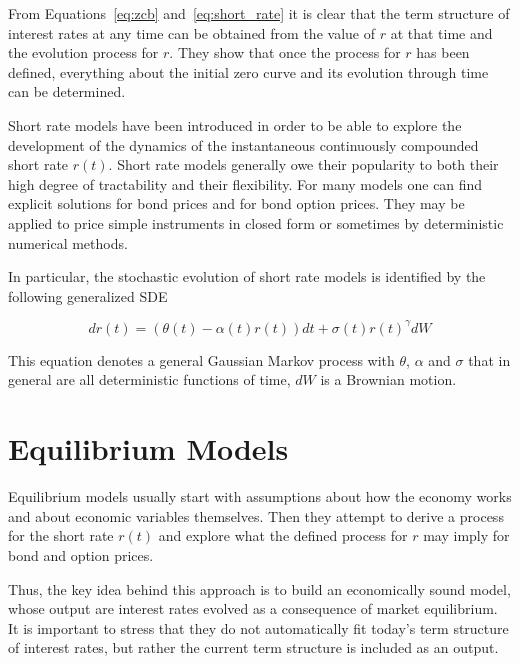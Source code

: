 
From Equations~\ref{eq:zcb} and~\ref{eq:short_rate} it is clear that 
the term structure of interest rates at any time can be obtained from 
the value of \(r\) at that time and the evolution process for \(r\). 
They show that once the process for \(r\) has been
defined, everything about the initial zero curve and its evolution through
time can be determined.

Short rate models have been introduced in order to be able to explore the development
of the dynamics of the instantaneous continuously compounded short rate $r(t)$.
Short rate models generally owe their popularity to both their high degree of
tractability and their flexibility. For many models one can find explicit solutions
for bond prices and for bond option prices. They may be applied to price simple
instruments in closed form or sometimes by deterministic numerical methods.

In particular, the stochastic evolution of short rate models is identified by
the following generalized SDE

\begin{equation}
dr(t) = (\theta(t) − \alpha(t)r(t)) dt + \sigma(t)r(t)^{\gamma} dW
\label{eq:short_rate_sde}
\end{equation}

This equation denotes a general Gaussian Markov process with $\theta$, $\alpha$ and $\sigma$
that in general are all deterministic functions of time, $dW$ is a Brownian motion.

\section{Equilibrium Models}\label{equilibrium-models}

Equilibrium models usually start with assumptions about how the economy works 
and about economic variables themselves. Then they attempt to derive a process 
for the short rate $r(t)$ and explore what the defined process 
for $r$ may imply for bond and option prices.

Thus, the key idea behind this approach is to build an economically 
sound model, whose output are interest rates evolved as a consequence 
of market equilibrium.
It is important to stress that they do not automatically fit today’s term 
structure of interest rates, but rather the current term structure is 
included as an output. 


